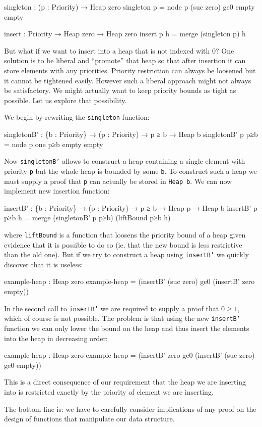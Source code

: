 \begin{code}
singleton : (p : Priority) → Heap zero
singleton p = node p (suc zero) ge0 empty empty

insert : Priority → Heap zero → Heap zero
insert p h = merge (singleton p) h
\end{code}

But what if we want to insert into a heap that is not indexed with 0? One solution is to be liberal and ``promote'' that heap so that after insertion it can store elements with any priorities. Priority restriction can always be loosened but it cannot be tightened easily. However such a liberal approach might not always be satisfactory. We might actually want to keep priority bounds as tight as possible. Let us explore that possibility.

We begin by rewriting the \texttt{singleton} function:

\begin{code}
singletonB' : \{b : Priority\} → (p : Priority) → p ≥ b → Heap b
singletonB' p p≥b = node p one p≥b empty empty
\end{code}
\noindent
Now \texttt{singletonB'} allows to construct a heap containing a single element with priority \texttt{p} but the whole heap is bounded by some \texttt{b}. To construct such a heap we must supply a proof that \texttt{p} can actually be stored in \texttt{Heap b}. We can now implement new insertion function:

\begin{small}
\begin{code}
insertB' : \{b : Priority\} → (p : Priority) → p ≥ b → Heap p → Heap b
insertB' p p≥b h = merge (singletonB' p p≥b) (liftBound p≥b h)
\end{code}
\end{small}
\noindent
where \texttt{liftBound} is a function that loosens the priority bound of a heap given evidence that it is possible to do so (ie. that the new bound is less restrictive than the old one). But if we try to construct a heap using \texttt{insertB'} we quickly discover that it is useless:

\begin{code}
example-heap : Heap zero
example-heap = (insertB' (suc zero) ge0
               (insertB' zero  empty))
\end{code}
\noindent
In the second call to \texttt{insertB'} we are required to supply a proof that $0 \ge 1$, which of course is not possible. The problem is that using the new \texttt{insertB'} function we can only lower the bound on the heap and thus insert the elements into the heap in decreasing order:

\begin{code}
example-heap : Heap zero
example-heap = (insertB' zero ge0
               (insertB' (suc zero) ge0 empty))
\end{code}
\noindent
This is a direct consequence of our requirement that the heap we are inserting into is restricted exactly by the priority of element we are inserting.

The bottom line is: we have to carefully consider implications of any proof on the design of functions that manipulate our data structure.